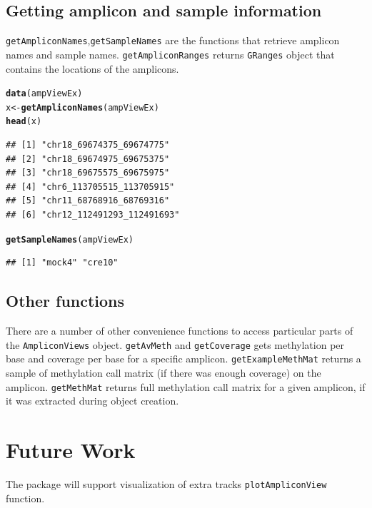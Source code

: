 \documentclass{article}\usepackage[]{graphicx}\usepackage[]{color}
\makeatletter
\newcommand{\hlstd}[1]{\textcolor[rgb]{0.345,0.345,0.345}{#1}}%
\newcommand{\hlkwb}[1]{\textcolor[rgb]{0.69,0.353,0.396}{#1}}%
\newcommand{\hlkwd}[1]{\textcolor[rgb]{0.737,0.353,0.396}{\textbf{#1}}}%
\newenvironment{kframe}{%
 \def\at@end@of@kframe{}%
 \ifinner\ifhmode%
  \def\at@end@of@kframe{\end{minipage}}%
  \begin{minipage}{\columnwidth}%
 \fi\fi%
 \def\FrameCommand##1{\hskip\@totalleftmargin \hskip-\fboxsep
 \colorbox{shadecolor}{##1}\hskip-\fboxsep
     \hskip-\linewidth \hskip-\@totalleftmargin \hskip\columnwidth}%
 \MakeFramed {\advance\hsize-\width
   \@totalleftmargin\z@ \linewidth\hsize
   \@setminipage}}%
 {\par\unskip\endMakeFramed%
 \at@end@of@kframe}
\newenvironment{knitrout}{}{} %
\makeatother
\begin{document}
\subsection{Getting amplicon and sample information}
\texttt{getAmpliconNames},\texttt{getSampleNames} are the functions that retrieve
amplicon names and sample names. \texttt{getAmpliconRanges} returns \texttt{GRanges}
object that contains the locations of the amplicons.
\begin{knitrout}
\color{fgcolor}\begin{kframe}
\begin{alltt}
\hlkwd{data}\hlstd{(ampViewEx)}
\hlstd{x} \hlkwb{<-} \hlkwd{getAmpliconNames}\hlstd{(ampViewEx)}
\hlkwd{head}\hlstd{(x)}
\end{alltt}
\begin{verbatim}
## [1] "chr18_69674375_69674775"  
## [2] "chr18_69674975_69675375"  
## [3] "chr18_69675575_69675975"  
## [4] "chr6_113705515_113705915" 
## [5] "chr11_68768916_68769316"  
## [6] "chr12_112491293_112491693"
\end{verbatim}
\begin{alltt}
\hlkwd{getSampleNames}\hlstd{(ampViewEx)}
\end{alltt}
\begin{verbatim}
## [1] "mock4" "cre10"
\end{verbatim}
\end{kframe}
\end{knitrout}

\subsection{Other functions}
There are a number of other convenience functions to access particular parts of the
\texttt{AmpliconViews} object. \texttt{getAvMeth} and \texttt{getCoverage} gets
methylation per base and coverage per base for a specific amplicon. \texttt{getExampleMethMat}
returns a sample of methylation call matrix (if there was enough coverage) on the amplicon.
\texttt{getMethMat} returns full methylation call matrix for a given amplicon, if
it was extracted during object creation.

\section{Future Work}
The package will support visualization of extra tracks \texttt{plotAmpliconView} function.
\end{document}
